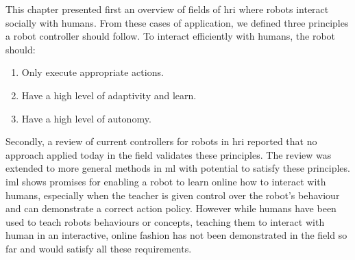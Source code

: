 This chapter presented first an overview of fields of \gls{hri} where robots interact socially with humans. From these cases of application, we defined three principles a robot controller should follow. To interact efficiently with humans, the robot should:
\begin{enumerate}
   	\item Only execute appropriate actions.
   	\item Have a high level of adaptivity and learn.
   	\item Have a high level of autonomy.
\end{enumerate}

Secondly, a review of current controllers for robots in \gls{hri} reported that no approach applied today in the field validates these principles. The review was extended to more general methods in \gls{ml} with potential to satisfy these principles. \gls{iml} shows promises for enabling a robot to learn online how to interact with humans, especially when the teacher is given control over the robot's behaviour and can demonstrate a correct action policy. However while humans have been used to teach robots behaviours or concepts, teaching them to interact with human in an interactive, online fashion has not been demonstrated in the field so far and would satisfy all these requirements.